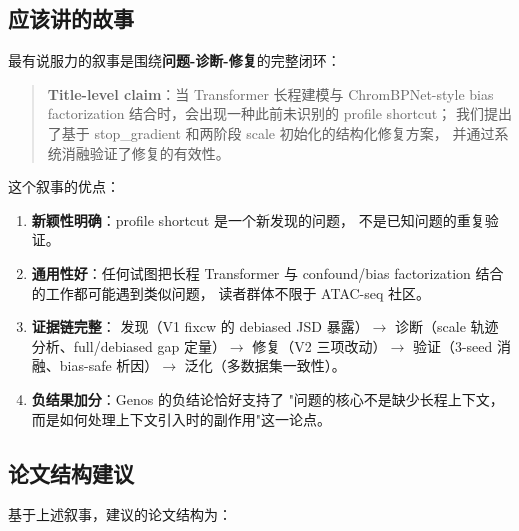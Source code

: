 \documentclass[11pt,a4paper]{ctexart}
\begin{document}
\subsection{应该讲的故事}

最有说服力的叙事是围绕\textbf{问题-诊断-修复}的完整闭环：

\begin{quote}
\textbf{Title-level claim}：当 Transformer 长程建模与 ChromBPNet-style
bias factorization 结合时，会出现一种此前未识别的 profile shortcut；
我们提出了基于 stop\_gradient 和两阶段 scale 初始化的结构化修复方案，
并通过系统消融验证了修复的有效性。
\end{quote}

这个叙事的优点：

\begin{enumerate}[leftmargin=2em]
  \item \textbf{新颖性明确}：profile shortcut 是一个新发现的问题，
    不是已知问题的重复验证。
  \item \textbf{通用性好}：任何试图把长程 Transformer 与
    confound/bias factorization 结合的工作都可能遇到类似问题，
    读者群体不限于 ATAC-seq 社区。
  \item \textbf{证据链完整}：
    发现（V1 fixcw 的 debiased JSD 暴露）$\to$
    诊断（scale 轨迹分析、full/debiased gap 定量）$\to$
    修复（V2 三项改动）$\to$
    验证（3-seed 消融、bias-safe 析因）$\to$
    泛化（多数据集一致性）。
  \item \textbf{负结果加分}：Genos 的负结论恰好支持了
    "问题的核心不是缺少长程上下文，而是如何处理上下文引入时的副作用"这一论点。
\end{enumerate}

\subsection{论文结构建议}

基于上述叙事，建议的论文结构为：
\end{document}
